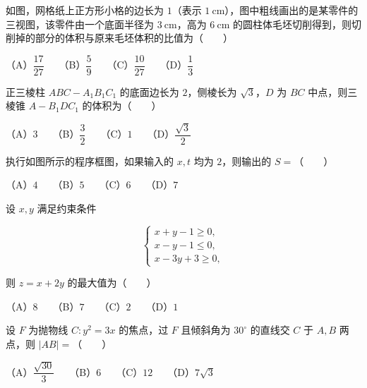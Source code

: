 \begin{question}
如图，网格纸上正方形小格的边长为 $1$（表示 $1\ \mathrm{cm}$），图中粗线画出的是某零件的三视图，该零件由一个底面半径为 $3\ \mathrm{cm}$，高为 $6\ \mathrm{cm}$ 的圆柱体毛坯切削得到，则切削掉的部分的体积与原来毛坯体积的比值为\mbox{（　　）}
\nopagebreak[4]
\begin{center}\end{center}
\nopagebreak[4]
（A）$\dfrac{17}{27}$　　（B）$\dfrac59$　　（C）$\dfrac{10}{27}$　　（D）$\dfrac13$

\end{question}
\begin{question}
正三棱柱 $ABC-A_1B_1C_1$ 的底面边长为 $2$，侧棱长为 $\sqrt3$，$D$ 为 $BC$ 中点，则三棱锥 $A-B_1DC_1$ 的体积为\mbox{（　　）}

（A）$3$　　（B）$\dfrac32$　　（C）$1$　　（D）$\dfrac{\sqrt3}{2}$

\Needspace{0.4\textheight}
\end{question}
\begin{question}
执行如图所示的程序框图，如果输入的 $x,t$ 均为 $2$，则输出的 $S=$\mbox{（　　）}
\nopagebreak[4]
\begin{center}\end{center}
\nopagebreak[4]
（A）$4$　　（B）$5$　　（C）$6$　　（D）$7$

\end{question}
\begin{question}
设 $x,y$ 满足约束条件

\nopagebreak[4]
\[
\begin{cases}
x+y-1\geqslant0,\\
x-y-1\leqslant0,\\
x-3y+3\geqslant0,
\end{cases}
\]

则 $z=x+2y$ 的最大值为\mbox{（　　）}

（A）$8$　　（B）$7$　　（C）$2$　　（D）$1$

\end{question}
\begin{question}
设 $F$ 为抛物线 $C:y^2=3x$ 的焦点，过 $F$ 且倾斜角为 $30^\circ$ 的直线交 $C$ 于 $A,B$ 两点，则 $|AB|=$\mbox{（　　）}

（A）$\dfrac{\sqrt{30}}3$　　（B）$6$　　（C）$12$　　（D）$7\sqrt3$

\end{question}
